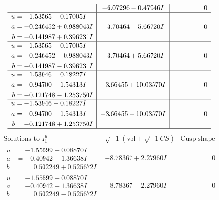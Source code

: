 \documentclass[1p]{elsarticle_modified}
\theoremstyle{definition}
\newcommand{\I}{\sqrt{-1}}
\begin{document}
$$\begin{array}{c|c|c}
 & -6.07296 - 0.47946 I & \phantom{-0.000000 } 0 \\ \hline\begin{aligned}
u &= \phantom{-}1.53565 + 0.17005 I \\
a &= -0.246452 + 0.988043 I \\
b &= -0.141987 + 0.396231 I\end{aligned}
 & -3.70464 - 5.66720 I & \phantom{-0.000000 } 0 \\ \hline\begin{aligned}
u &= \phantom{-}1.53565 - 0.17005 I \\
a &= -0.246452 - 0.988043 I \\
b &= -0.141987 - 0.396231 I\end{aligned}
 & -3.70464 + 5.66720 I & \phantom{-0.000000 } 0 \\ \hline\begin{aligned}
u &= -1.53946 + 0.18227 I \\
a &= \phantom{-}0.94700 - 1.54313 I \\
b &= -0.121748 - 1.253750 I\end{aligned}
 & -3.66455 + 10.03570 I & \phantom{-0.000000 } 0 \\ \hline\begin{aligned}
u &= -1.53946 - 0.18227 I \\
a &= \phantom{-}0.94700 + 1.54313 I \\
b &= -0.121748 + 1.253750 I\end{aligned}
 & -3.66455 - 10.03570 I & \phantom{-0.000000 } 0\\
 \hline 
 \end{array}$$\newpage$$\begin{array}{c|c|c}  
\text{Solutions to }I^u_{1}& \I (\text{vol} + \sqrt{-1}CS) & \text{Cusp shape}\\
 \hline 
\begin{aligned}
u &= -1.55599 + 0.08870 I \\
a &= -0.40942 + 1.36638 I \\
b &= \phantom{-}0.502249 + 0.525672 I\end{aligned}
 & -8.78367 + 2.27960 I & \phantom{-0.000000 } 0 \\ \hline\begin{aligned}
u &= -1.55599 - 0.08870 I \\
a &= -0.40942 - 1.36638 I \\
b &= \phantom{-}0.502249 - 0.525672 I\end{aligned}
 & -8.78367 - 2.27960 I & \phantom{-0.000000 } 0 \\ \hline\begin{aligned}

\end{aligned}
\end{array}$$
\end{document}
